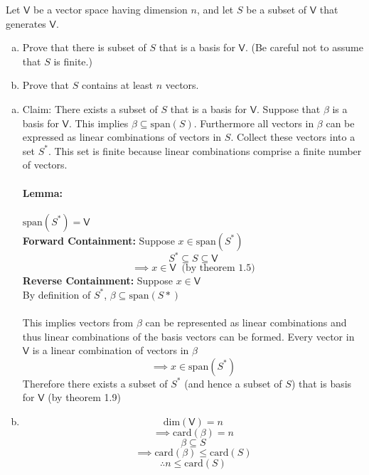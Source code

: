 Let $\mathsf{V}$ be a vector space having dimension $n$, and let $S$
be a subset of $\mathsf{V}$ that generates $\mathsf{V}$.
\begin{enumerate}[(a)]
\item Prove that there is subset of $S$ that is a basis for
  $\mathsf{V}$. (Be careful not to assume that $S$ is finite.)
\item Prove that $S$ contains at least $n$ vectors.
\end{enumerate}
\begin{enumerate}[(a)]
\item Claim: There exists a subset of $S$ that is a basis for
  $\mathsf{V}$. Suppose that $\beta$ is a basis for $\mathsf{V}$. This
  implies $\beta\subseteq\text{span}(S)$. Furthermore all vectors in
  $\beta$ can be expressed as linear combinations of vectors in
  $S$. Collect these vectors into a set $S^*$. This set is finite
  because linear combinations comprise a finite number of vectors.
\paragraph{Lemma:} $\text{span}(S^*)=\mathsf{V}$
\\\textbf{Forward Containment:} Suppose $x\in \text{span}(S^*)$
\begin{equation}
S^* \subseteq S \subseteq \mathsf{V}
\end{equation}
\begin{equation}
\implies x \in \mathsf{V}\;\;\text{(by theorem 1.5)}
\end{equation}
\textbf{Reverse Containment:} Suppose $x\in\mathsf{V}$
\\By definition of $S^*$, $\beta\subseteq \text{span}(S*)$
\paragraph{} This implies vectors from $\beta$ can be represented as
linear combinations and thus linear combinations of the basis vectors
can be formed. Every vector in $\mathsf{V}$ is a linear combination of
vectors in $\beta$
\begin{equation}
\implies x \in \text{span}(S^*)
\end{equation}
Therefore there exists a subset of $S^*$ (and hence a subset of $S$) that is basis for
$\mathsf{V}$ (by theorem 1.9)
\item
\begin{equation}
\text{dim}(\mathsf{V}) = n
\end{equation}
\begin{equation}
\implies \text{card}(\beta) = n
\end{equation}
\begin{equation}
\beta \subseteq S
\end{equation}
\begin{equation}
\implies \text{card}(\beta) \leq \text{card}(S)
\end{equation}
\begin{equation}
\therefore n\leq \text{card}(S)
\end{equation}
\end{enumerate}
